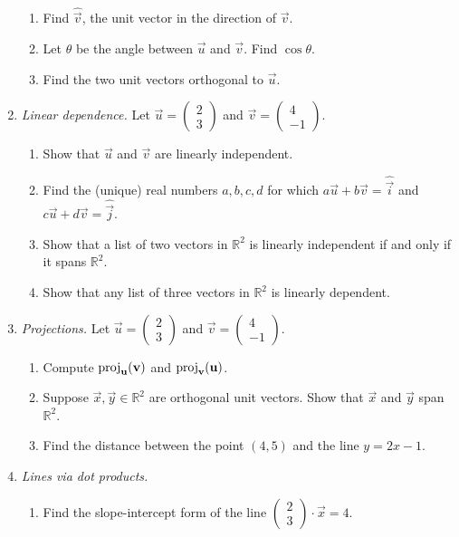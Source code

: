 \begin{enumerate}
\begin{enumerate}
\item Find $\hat{\vec{v}}$, the unit vector in the direction of $\vec{v}$.
\item Let $\theta$ be the angle between $\vec{u}$ and $\vec{v}$. Find $\cos\theta$.
\item Find the two unit vectors orthogonal to $\vec{u}$.
\end{enumerate}
\item \emph{Linear dependence.} Let $\vec{u} = \begin{pmatrix} 2 \\ 3 \end{pmatrix}$ and $\vec{v} = \begin{pmatrix} 4 \\ -1 \end{pmatrix}$.
\begin{enumerate}
\item Show that $\vec{u}$ and $\vec{v}$ are linearly independent.
\item Find the (unique) real numbers $a,b,c,d$ for which $a\vec{u} + b\vec{v} = \hat{\vec{i}}$ and $c\vec{u} + d\vec{v} = \hat{\vec{j}}$.
\item Show that a list of two vectors in $\mathbb{R}^2$ is linearly independent if and only if it spans $\mathbb{R}^2$.
\item Show that any list of three vectors in $\mathbb{R}^2$ is linearly dependent.
\end{enumerate}
\item \emph{Projections.} Let $\vec{u} = \begin{pmatrix} 2 \\ 3 \end{pmatrix}$ and $\vec{v} = \begin{pmatrix} 4 \\ -1 \end{pmatrix}$.
\begin{enumerate}
\item Compute $\operatorname{proj}_{\mathbf{u}}(\mathbf{v})$ and $\operatorname{proj}_{\mathbf{v}}(\mathbf{u})$.
\item Suppose $\vec{x},\vec{y}\in\mathbb{R}^2$ are orthogonal unit vectors. Show that $\vec{x}$ and $\vec{y}$ span $\mathbb{R}^2$.
\item Find the distance between the point $(4,5)$ and the line $y = 2x - 1$.
\end{enumerate}
\item \emph{Lines via dot products.} 
\begin{enumerate}
\item Find the slope-intercept form of the line $\begin{pmatrix} 2 \\ 3 \end{pmatrix}\cdot\vec{x} = 4$.

\end{enumerate}
\end{enumerate}

